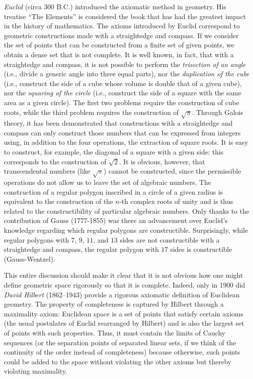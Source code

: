 \label{nota:Euclide}%
\label{nota:Hilbert}%
%
%
%
%
\emph{Euclid} (circa 300 B.C.) introduced the axiomatic method in geometry. His treatise ``The Elements'' is considered the book that has had the greatest impact in the history of mathematics. The axioms introduced by Euclid correspond to geometric constructions made with a straightedge and compass. If we consider the set of points that can be constructed from a finite set of given points, we obtain a dense set that is not complete. It is well known, in fact, that with a straightedge and compass, it is not possible to perform the \emph{trisection of an angle} (i.e., divide a generic angle into three equal parts), nor the \emph{duplication of the cube} (i.e., construct the side of a cube whose volume is double that of a given cube), nor the \emph{squaring of the circle} (i.e., construct the side of a square with the same area as a given circle). The first two problems require the construction of cube roots, while the third problem requires the construction of $\sqrt\pi$. Through Galois theory, it has been demonstrated that constructions with a straightedge and compass can only construct those numbers that can be expressed from integers using, in addition to the four operations, the extraction of square roots. It is easy to construct, for example, the diagonal of a square with a given side: this corresponds to the construction of $\sqrt 2$. It is obvious, however, that transcendental numbers (like $\sqrt\pi$) cannot be constructed, since the permissible operations do not allow us to leave the set of algebraic numbers. The construction of a regular polygon inscribed in a circle of a given radius is equivalent to the construction of the $n$-th complex roots of unity and is thus related to the constructibility of particular algebraic numbers. Only thanks to the contribution of Gauss (1777-1855) was there an advancement over Euclid's knowledge regarding which regular polygons are constructible. Surprisingly, while regular polygons with $7$, $9$, $11$, and $13$ sides are not constructible with a straightedge and compass, the regular polygon with $17$ sides is constructible (Gauss-Wentzel).

This entire discussion should make it clear that it is not obvious how one might
define geometric space rigorously so that it is complete. Indeed, only in 1900
did \emph{David Hilbert} (1862--1943) provide a rigorous axiomatic definition of
Euclidean geometry. The property of completeness is captured by Hilbert through
a maximality axiom: Euclidean space is a set of points that satisfy certain
axioms (the usual postulates of Euclid rearranged by Hilbert) and is also the
largest set of points with such properties. Thus, it must contain the limits of
Cauchy sequences (or the separation points of separated linear sets, if we think
of the continuity of the order instead of completeness) because otherwise, such
points could be added to the space without violating the other axioms but
thereby violating maximality.

